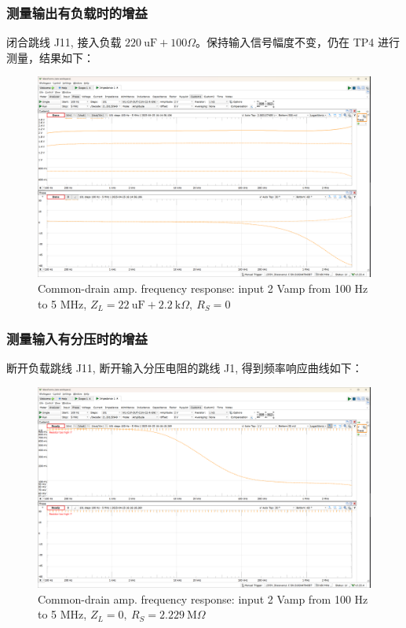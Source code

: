 \documentclass[UTF8]{article}
\begin{document}
\newpage
\subsubsection{测量输出有负载时的增益}

闭合跳线 J11, 接入负载 $220 \ \mathrm{uF} + 100 \Omega$。保持输入信号幅度不变，仍在 TP4 进行测量，结果如下：
\begin{figure}[H]\centering
    \includegraphics[width=0.97\columnwidth]{LCE-04-场效应管/assets/cd amp/cd amp output impedance, R_L = 100 Ohm (input 2 Vamp, 100Hz ~ 5MHz).png}
    \caption{Common-drain amp. frequency response: input 2 Vamp from 100 Hz to 5 MHz, $Z_L = 22 \ \mathrm{uF} + 2.2 \ \mathrm{k}\Omega,\ R_S = 0$}
\end{figure}

\subsubsection{测量输入有分压时的增益}

断开负载跳线 J11, 断开输入分压电阻的跳线 J1, 得到频率响应曲线如下：
\begin{figure}[H]\centering
    \includegraphics[width=0.97\columnwidth]{LCE-04-场效应管/assets/cd amp/cd amp input impedance, R_S = 2M229 (input 2 Vamp, 100Hz ~ 5MHz).png}
    \caption{Common-drain amp. frequency response: input 2 Vamp from 100 Hz to 5 MHz, $Z_L = 0,\ R_S = 2.229 \ \mathrm{M}\Omega$}
\end{figure}
\end{document}
